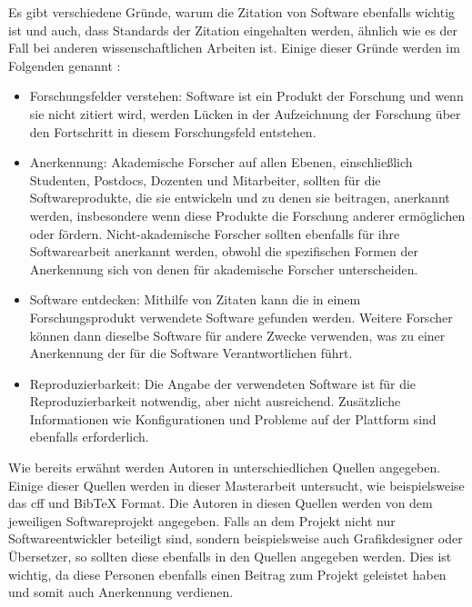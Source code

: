 Es gibt verschiedene Gründe, warum die Zitation von Software ebenfalls wichtig ist und auch, dass Standards der Zitation eingehalten werden, ähnlich wie es der Fall bei anderen wissenschaftlichen Arbeiten ist.
Einige dieser Gründe werden im Folgenden genannt \autocite{smith_software_2016}:

\begin{itemize}
    \item Forschungsfelder verstehen: Software ist ein Produkt der Forschung und wenn sie nicht zitiert wird, werden Lücken in der Aufzeichnung der Forschung über den Fortschritt in diesem Forschungsfeld entstehen.
    \item Anerkennung: Akademische Forscher auf allen Ebenen, einschließlich Studenten, Postdocs, Dozenten und Mitarbeiter, sollten für die Softwareprodukte, die sie entwickeln und zu denen sie beitragen, anerkannt werden, insbesondere wenn diese Produkte die Forschung anderer ermöglichen oder fördern. Nicht-akademische Forscher sollten ebenfalls für ihre Softwarearbeit anerkannt werden, obwohl die spezifischen Formen der Anerkennung sich von denen für akademische Forscher unterscheiden.
    \item Software entdecken: Mithilfe von Zitaten kann die in einem Forschungsprodukt verwendete Software gefunden werden. Weitere Forscher können dann dieselbe Software für andere Zwecke verwenden, was zu einer Anerkennung der für die Software Verantwortlichen führt.
    \item Reproduzierbarkeit: Die Angabe der verwendeten Software ist für die Reproduzierbarkeit notwendig, aber nicht ausreichend. Zusätzliche Informationen wie Konfigurationen und Probleme auf der Plattform sind ebenfalls erforderlich.
\end{itemize}

Wie bereits erwähnt werden Autoren in unterschiedlichen Quellen angegeben.
Einige dieser Quellen werden in dieser Masterarbeit untersucht, wie beispielsweise das \gls{cff} und Bib\TeX{} Format.
Die Autoren in diesen Quellen werden von dem jeweiligen Softwareprojekt angegeben.
Falls an dem Projekt nicht nur Softwareentwickler beteiligt sind, sondern beispielsweise auch Grafikdesigner oder Übersetzer, so sollten diese ebenfalls in den Quellen angegeben werden.
Dies ist wichtig, da diese Personen ebenfalls einen Beitrag zum Projekt geleistet haben und somit auch Anerkennung verdienen.

